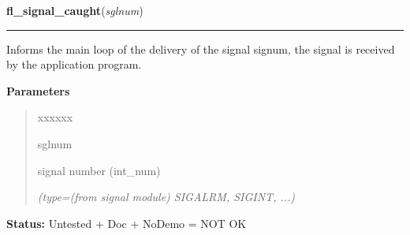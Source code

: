 \hspace{.8\funcindent}\begin{boxedminipage}{\funcwidth}

    \raggedright \textbf{fl\_signal\_caught}(\textit{sglnum})

    \vspace{-1.5ex}

    \rule{\textwidth}{0.5\fboxrule}
\setlength{\parskip}{2ex}
    Informs the main loop of the delivery of the signal signum, the signal 
    is received by the application program.

\setlength{\parskip}{1ex}
      \textbf{Parameters}
      \vspace{-1ex}

      \begin{quote}
        \begin{Ventry}{xxxxxx}

          \item[sglnum]

          signal number (int\_num)

            {\it (type=(from signal module) SIGALRM, SIGINT, ...)}

        \end{Ventry}

      \end{quote}

\textbf{Status:} Untested + Doc + NoDemo = NOT OK



    \end{boxedminipage}

    \label{xformslib:library:fl_app_signal_direct}

    \vspace{0.5ex}

